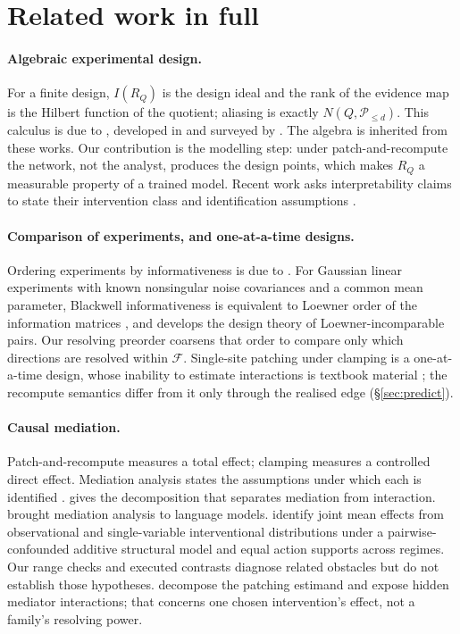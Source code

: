 \section{Related work in full}
\label{app:related}

\paragraph{Algebraic experimental design.} For a finite design, $I(R_Q)$ is the design ideal and the rank of the
evidence map is the Hilbert function of the quotient; aliasing is exactly $N(Q,\mathcal P_{\le d})$. This calculus is
due to \citet{pistone1996groebner}, developed in \citet{pistone2001algebraic} and surveyed by
\citet{maruri2012algebraic}. The algebra is inherited from these works. Our contribution is the modelling step: under patch-and-recompute the network,
not the analyst, produces the design points, which makes $R_Q$ a measurable property of a trained model. Recent work
asks interpretability claims to state their intervention class and identification assumptions
\citep{joshi2026causality,lin2026disclose}.

\paragraph{Comparison of experiments, and one-at-a-time designs.} Ordering experiments by informativeness is due to
\citet{blackwell1953equivalent}. For Gaussian linear experiments with known nonsingular noise covariances and a common
mean parameter, Blackwell informativeness is equivalent to Loewner order of the information matrices
\citep{hansen1974comparison}, and \citet{pukelsheim2006optimal} develops the design theory of Loewner-incomparable
pairs. Our resolving preorder coarsens that order to compare only which directions are resolved within $\mathcal F$. Single-site patching
under clamping is a one-at-a-time design, whose inability to estimate interactions is textbook material
\citep{czitrom1999ofat}; the recompute semantics differ from it only through the realised edge (\S\ref{sec:predict}).

\paragraph{Causal mediation.} Patch-and-recompute measures a total effect; clamping measures a controlled direct effect.
Mediation analysis states the assumptions under which each is identified
\citep{pearl2001direct,robins1992identifiability,vanderweele2015explanation}.
\citet{vanderweele2014fourway} gives the decomposition that separates mediation from interaction. \citet{vig2020gender} brought mediation analysis to
language models. \citet{kekic2025joint} identify joint mean effects from observational and single-variable
interventional distributions under a pairwise-confounded additive structural model and equal action supports across
regimes. Our range checks and executed contrasts diagnose related obstacles but do not establish those hypotheses.
\citet{vaidyanathan2026curse} decompose the patching estimand and expose hidden mediator interactions; that concerns
one chosen intervention's effect, not a family's resolving power.

